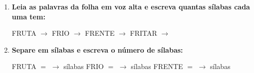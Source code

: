 \begin{exercicio}
\begin{enumerate}[resume]
  \item \textbf{Leia as palavras da folha em voz alta e escreva quantas sílabas cada uma tem:}

  \begin{center}
  FRUTA $\rightarrow$ \underline{\hspace{1cm}} \quad FRIO $\rightarrow$ \underline{\hspace{1cm}} \quad FRENTE $\rightarrow$ \underline{\hspace{1cm}} \quad FRITAR $\rightarrow$ \underline{\hspace{1cm}}
  \end{center}

  \item \textbf{Separe em sílabas e escreva o número de sílabas:}
  \begin{center}
  FRUTA $=$ \underline{\hspace{1.2cm}} $\rightarrow$ \underline{\hspace{0.8cm}} sílabas \quad FRIO $=$ \underline{\hspace{1.2cm}} $\rightarrow$ \underline{\hspace{0.8cm}} sílabas \quad FRENTE $=$ \underline{\hspace{1.2cm}} $\rightarrow$ \underline{\hspace{0.8cm}} sílabas
  \end{center}

\end{enumerate}

\end{exercicio}



